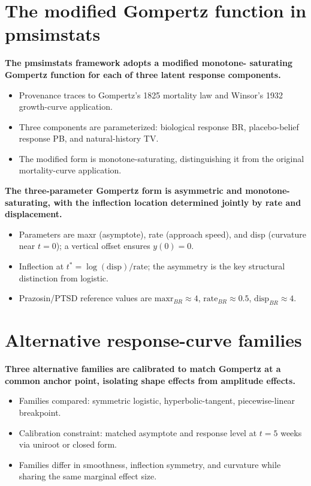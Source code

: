 \documentclass[
  11pt,
]{article}
\begin{document}
\section{The modified Gompertz function in pmsimstats}\label{the-modified-gompertz-function-in-pmsimstats}

\textbf{The pmsimstats framework adopts a modified monotone-
saturating Gompertz function for each of three latent response
components.}

\begin{itemize}\setlength{\itemsep}{2pt}\setlength{\parskip}{0pt}
\item Provenance traces to Gompertz's 1825 mortality law and
  Winsor's 1932 growth-curve application.
\item Three components are parameterized: biological response
  BR, placebo-belief response PB, and natural-history TV.
\item The modified form is monotone-saturating, distinguishing
  it from the original mortality-curve application.
\end{itemize}

\textbf{The three-parameter Gompertz form is asymmetric and
monotone-saturating, with the inflection location determined
jointly by rate and displacement.}

\begin{itemize}\setlength{\itemsep}{2pt}\setlength{\parskip}{0pt}
\item Parameters are maxr (asymptote), rate (approach speed),
  and disp (curvature near $t = 0$); a vertical offset ensures
  $y(0) = 0$.
\item Inflection at $t^* = \log(\mathrm{disp})/\mathrm{rate}$;
  the asymmetry is the key structural distinction from logistic.
\item Prazosin/PTSD reference values are
  $\mathrm{maxr}_{BR} \approx 4$, $\mathrm{rate}_{BR}
  \approx 0.5$, $\mathrm{disp}_{BR} \approx 4$.
\end{itemize}

\section{Alternative response-curve families}\label{alternative-response-curve-families}

\textbf{Three alternative families are calibrated to match
Gompertz at a common anchor point, isolating shape effects
from amplitude effects.}

\begin{itemize}\setlength{\itemsep}{2pt}\setlength{\parskip}{0pt}
\item Families compared: symmetric logistic, hyperbolic-tangent,
  piecewise-linear breakpoint.
\item Calibration constraint: matched asymptote and response
  level at $t = 5$ weeks via uniroot or closed form.
\item Families differ in smoothness, inflection symmetry, and
  curvature while sharing the same marginal effect size.
\end{itemize}
\end{document}
